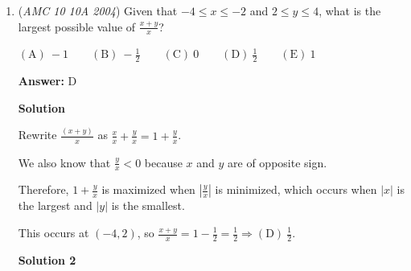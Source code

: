 \begin{enumerate}
 \textbf{Answer: }A



\textbf{Solution 1}

Let the total value, in cents, of the coins Paula has originally be $v$, and the number of coins she has be $n$. Then $\frac{v}{n}=20\Longrightarrow v=20n$ and $\frac{v+25}{n+1}=21$. Substituting yields: $20n+25=21(n+1),$ so $n=4$, $v = 80.$  Then, we see that the only way Paula can satisfy this rule is if she had $3$ quarters and $1$ nickel in her purse. Thus, she has $\boxed{\mathrm{(A)}\ 0}$ dimes.

 



\textbf{Solution 2}

If the new coin was worth $20$ cents, adding it would not change the mean. The additional $5$ cents raise the mean by $1$, thus the new number of coins must be $5$. Therefore there were $4$ coins worth a total of $4\times20=80$ cents. As in the previous solution, we conclude that the only way to get $80$ cents using $4$ coins is $25+25+25+5$. Thus, having three quarters, one nickel, and no dimes $\boxed{\mathrm{(A)}\ 0}.$

 Education, the Study of Everything

 


	\item (\textit{AMC 10 10A 2004}) Given that $-4\leq x\leq-2$ and $2\leq y\leq4$, what is the largest possible value of $\frac{x+y}{x}$?


 $\mathrm{(A) \ } -1 \qquad \mathrm{(B) \ } -\frac12 \qquad \mathrm{(C) \ } 0 \qquad \mathrm{(D) \ } \frac12 \qquad \mathrm{(E) \ } 1$

 \textbf{Answer: }D



\textbf{Solution}

Rewrite $\frac{(x+y)}x$ as $\frac{x}x+\frac{y}x=1+\frac{y}x$.

 We also know that $\frac{y}x<0$ because $x$ and $y$ are of opposite sign.

 Therefore, $1+\frac{y}x$ is maximized when $|\frac{y}x|$ is minimized, which occurs when $|x|$ is the largest and $|y|$ is the smallest.

 This occurs at $(-4,2)$, so $\frac{x+y}x=1-\frac12=\frac12\Rightarrow\boxed{\mathrm{(D)}\ \frac{1}{2}}$.

 


 



\textbf{Solution 2}


\end{enumerate}
